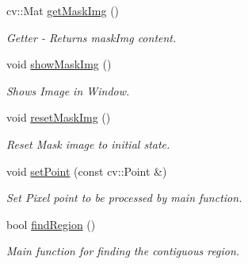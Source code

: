 \begin{DoxyCompactItemize}
cv\+::\+Mat \mbox{\hyperlink{class_converter_a1038402549bb55951554c6b45740137f}{get\+Mask\+Img}} ()
\begin{DoxyCompactList}\small\item\em Getter -\/ Returns \textquotesingle{}mask\+Img\textquotesingle{} content. \end{DoxyCompactList}\item 
void \mbox{\hyperlink{class_converter_afccc063ddf93903141b1fb629a7e1252}{show\+Mask\+Img}} ()
\begin{DoxyCompactList}\small\item\em Shows Image in Window. \end{DoxyCompactList}\item 
void \mbox{\hyperlink{class_converter_a5d4c43bb79d93081b0359b9821ab83ba}{reset\+Mask\+Img}} ()
\begin{DoxyCompactList}\small\item\em Reset Mask image to initial state. \end{DoxyCompactList}\item 
void \mbox{\hyperlink{class_converter_acc71625f678e032dbdd3c17e58580e4f}{set\+Point}} (const cv\+::\+Point \&)
\begin{DoxyCompactList}\small\item\em Set Pixel point to be processed by main function. \end{DoxyCompactList}\item 
bool \mbox{\hyperlink{class_converter_a4d50ec2ab4621cfc3b36f29f54e16a0b}{find\+Region}} ()
\begin{DoxyCompactList}\small\item\em Main function for finding the contiguous region. \end{DoxyCompactList}\end{DoxyCompactItemize}
